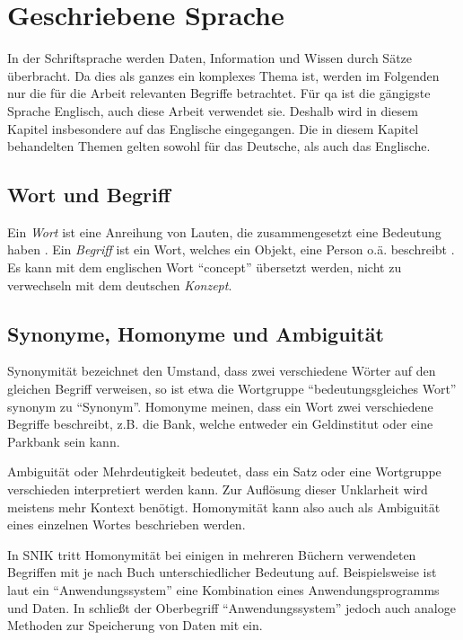 \section{Geschriebene Sprache}

In der Schriftsprache werden Daten, Information und Wissen durch Sätze überbracht.
Da dies als ganzes ein komplexes Thema ist, werden im Folgenden nur die für die Arbeit relevanten Begriffe betrachtet.
Für \acl*{qa} ist die gängigste Sprache Englisch, auch diese Arbeit verwendet sie.
Deshalb wird in diesem Kapitel insbesondere auf das Englische eingegangen.
Die in diesem Kapitel behandelten Themen gelten sowohl für das Deutsche, als auch das Englische.

\subsection{Wort und Begriff}

Ein \emph{Wort} ist eine Anreihung von Lauten, die zusammengesetzt eine Bedeutung haben \citep[S.~1185]{duden}.
Ein \emph{Begriff} ist ein Wort, welches ein Objekt, eine Person o.ä. beschreibt \citep[S.~235]{duden}.
Es kann mit dem englischen Wort \enquote{concept} übersetzt werden, nicht zu verwechseln mit dem deutschen \emph{Konzept}.

\subsection{Synonyme, Homonyme und Ambiguität}

Synonymität bezeichnet den Umstand, dass zwei verschiedene Wörter auf den gleichen Begriff verweisen, so ist etwa die Wortgruppe \enquote{bedeutungsgleiches Wort} synonym zu \enquote{Synonym}.
Homonyme meinen, dass ein Wort zwei verschiedene Begriffe beschreibt, z.B. die Bank, welche entweder ein Geldinstitut oder eine Parkbank sein kann.

Ambiguität oder Mehrdeutigkeit bedeutet, dass ein Satz oder eine Wortgruppe verschieden interpretiert werden kann.
Zur Auflösung dieser Unklarheit wird meistens mehr Kontext benötigt.
Homonymität kann also auch als Ambiguität eines einzelnen Wortes beschrieben werden.

In SNIK tritt Homonymität bei einigen in mehreren Büchern verwendeten Begriffen mit je nach Buch unterschiedlicher Bedeutung auf.
Beispielsweise ist laut \citet{he} ein \enquote{Anwendungssystem} eine Kombination eines Anwendungsprogramms und Daten.
In \citet{ob} schließt der Oberbegriff \enquote{Anwendungssystem} jedoch auch analoge Methoden zur Speicherung von Daten mit ein.

